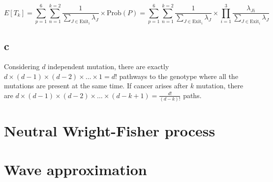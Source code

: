 \[E[T_k] = \sum\limits_{p=1}^{6} \sum\limits_{n=1}^{k=2} \frac{1}{\sum\limits_{J \in \text{Exit}_i} \lambda_J} \times \text{Prob}(P) = \sum\limits_{p=1}^{6} \sum\limits_{n=1}^{k=2} \frac{1}{\sum\limits_{J \in \text{Exit}_i} \lambda_J} \times \prod\limits_{i=1}^{3} \frac{\lambda_{Ji}}{\sum\limits_{J \in \text{Exit}_i} \lambda_J } \]

\subsection{c}

Considering $d$ independent mutation, there are exactly $d\times(d-1)\times(d-2)\times\dots\times1 = d!$ pathways to the genotype where all the mutations are present at the same time. If cancer arises after $k$ mutation, there are $d\times(d-1)\times(d-2)\times\dots\times(d-k+1) = \frac{d!}{(d-k)!}$ paths.

\setcounter{chapter}{5}
\setcounter{section}{0}
\section{Neutral Wright-Fisher process}

\setcounter{chapter}{6}
\setcounter{section}{0}
\section{Wave approximation}
